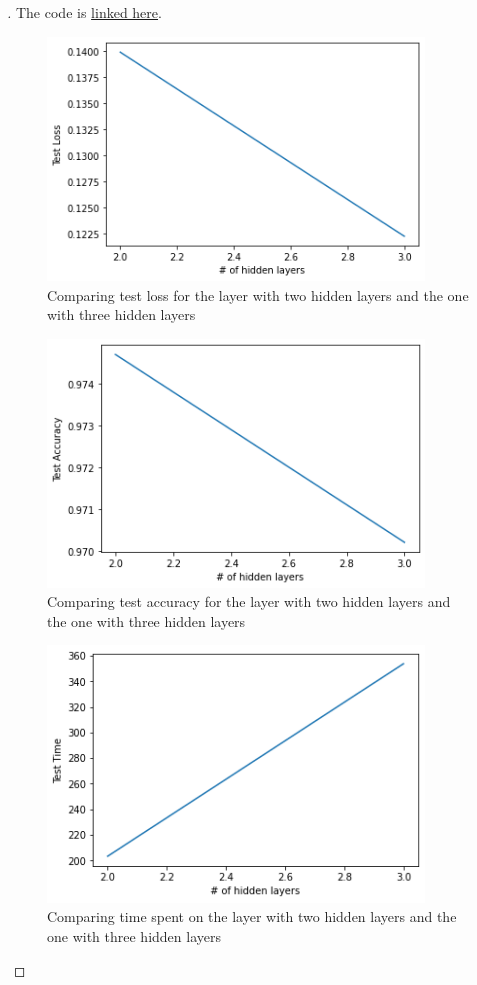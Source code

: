 \documentclass[12pt,oneside,geqno]{article}
\begin{document}
\begin{proof}[\color{red}{Solution}]
		The code is \href{https://colab.research.google.com/drive/1O7_bI8X7BIBYwJ2gF5oAiFXH7jwp902a?authuser=1#scrollTo=p_ujrM0L4yR9}{linked here}.
		\begin{figure}
			\centering
			\includegraphics[width=10cm]{../figs/loss_comp.png}
			\caption{Comparing test loss for the layer with two hidden layers and the one with three hidden layers}
			\label{img:loss}
		\end{figure}
		
		
		\begin{figure}
			\centering
			\includegraphics[width=10cm]{../figs/acc_comp.png}
			\caption{Comparing test accuracy for the layer with two hidden layers and the one with three hidden layers}
			\label{img:acc}
		\end{figure}
		
		
		\begin{figure}
			\centering
			\includegraphics[width=10cm]{../figs/time_comp.png}
			\caption{Comparing time spent on the layer with two hidden layers and the one with three hidden layers}
			\label{img:time}
		\end{figure}

		
	\end{proof}
	
\end{document}
